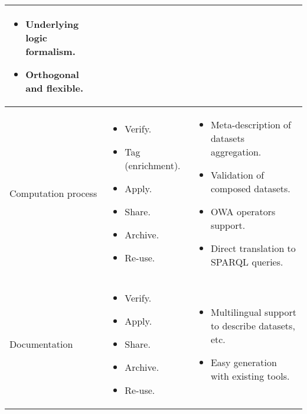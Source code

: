 \begin{table}[!htb]
\begin{center}
\begin{tabular}{|p{3cm}|p{3cm}|p{6.5cm}|}
\begin{itemize}
                  \item Underlying logic formalism.                  
                  \item Orthogonal and flexible.                 
                 \end{itemize} \\ \hline  
  Computation process &  \begin{itemize} \item Verify. \item Tag (enrichment). \item Apply. \item Share. \item Archive. \item Re-use. \end{itemize} & \begin{itemize}
                  \item Meta-description of datasets aggregation.
                  \item Validation of composed datasets.
                  \item OWA operators support.
                  \item Direct translation to SPARQL queries.  
                 \end{itemize} \\ \hline
  Documentation & \begin{itemize} \item Verify. \item Apply. \item Share. \item Archive. \item Re-use. \end{itemize} &\begin{itemize}
                  \item Multilingual support to describe datasets, etc.
                  \item Easy generation with existing tools.                
                 \end{itemize} \\ \hline      
                 

\end{tabular}
\end{center}
\end{table}
